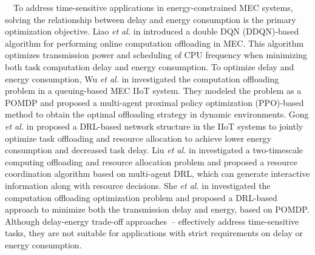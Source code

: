 \documentclass[12pt,draftclsnofoot,onecolumn]{IEEEtran}
\newenvironment{my}[2]%
{\begin{list}{}%
{\setlength{\rightmargin}{#1}\setlength{\leftmargin}{#2}}%


 \item[]{}

} {\end{list}}
\begin{document}
\begin{enumerate}
\begin{my}{1cm}{1cm}
{		\,\,\,\,
		To address time-sensitive applications in energy-constrained MEC systems, solving the relationship between delay and energy consumption is the primary optimization objective.
		Liao \textit{et al.} in \cite{liao2023online} introduced a double DQN (DDQN)-based algorithm for performing online computation offloading in MEC. This algorithm optimizes transmission power and scheduling of CPU frequency when minimizing both task computation delay and energy consumption. 
		To optimize delay and energy consumption, Wu \textit{et al.} in \cite{wu2023multi} investigated the computation offloading problem in a queuing-based MEC IIoT system. They modeled the problem as a POMDP and proposed a multi-agent proximal policy optimization (PPO)-based method to obtain the optimal offloading strategy in dynamic environments. 
		Gong \textit{et al.} in \cite{gong2022edge} proposed a DRL-based network structure in the IIoT systems to jointly optimize task offloading and resource allocation to achieve lower energy consumption and decreased task delay.
		Liu \textit{et al.} in \cite{liu2021learn} investigated a two-timescale computing offloading and resource allocation problem and proposed a resource coordination algorithm based on multi-agent DRL, which can generate interactive information along with resource decisions. 
		She \textit{et al.} in \cite{she2024efficient} investigated the computation offloading optimization problem and proposed a DRL-based approach to minimize both the transmission delay and energy, based on POMDP.
		Although delay-energy trade-off approaches~\cite{liao2023online}--\cite{she2024efficient} effectively address time-sensitive tasks, they are not suitable for applications with strict requirements on delay or energy consumption. \vspace{2mm}
		
		

}
\end{my}
\end{enumerate}
\end{document}
